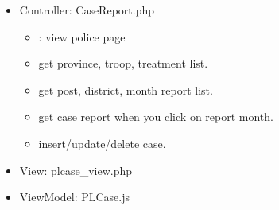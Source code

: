 \documentclass[letterpaper,10pt,english,openany,oneside]{sphinxmanual}
\begin{document}
\begin{itemize}
\item {} 
\sphinxAtStartPar
Controller: CaseReport.php
\begin{itemize}
\item {} 
\sphinxAtStartPar
{} : view police page

\item {} 
\sphinxAtStartPar
{} get province, troop, treatment list.

\item {} 
\sphinxAtStartPar
{} get post, district, month report list.

\item {} 
\sphinxAtStartPar
{} get case report when you click on report month.

\item {} 
\sphinxAtStartPar
{} insert/update/delete case.

\end{itemize}

\begin{sphinxVerbatim}[commandchars=\\\{\}]
     
   
      
   
 
\end{sphinxVerbatim}

\item {} 
\sphinxAtStartPar
View: plcase\_view.php

\item {} 
\sphinxAtStartPar
ViewModel: PLCase.js

\end{itemize}

\begin{sphinxVerbatim}[commandchars=\\\{\}]
  
  
    
    
  
  
     
     
\end{sphinxVerbatim}
\end{document}
